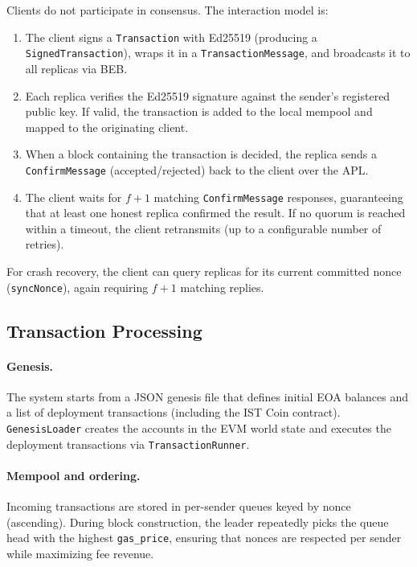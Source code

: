 \documentclass{llncs}
\begin{document}
Clients do not participate in consensus. The interaction model is:

\begin{enumerate}
    \item The client signs a \texttt{Transaction} with Ed25519 (producing a \texttt{SignedTransaction}), wraps it in a \texttt{TransactionMessage}, and broadcasts it to all replicas via BEB.
    \item Each replica verifies the Ed25519 signature against the sender's registered public key. If valid, the transaction is added to the local mempool and mapped to the originating client.
    \item When a block containing the transaction is decided, the replica sends a \texttt{ConfirmMessage} (accepted/rejected) back to the client over the APL.
    \item The client waits for $f{+}1$ matching \texttt{ConfirmMessage} responses, guaranteeing that at least one honest replica confirmed the result. If no quorum is reached within a timeout, the client retransmits (up to a configurable number of retries).
\end{enumerate}

For crash recovery, the client can query replicas for its current committed nonce (\texttt{syncNonce}), again requiring $f{+}1$ matching replies.

\subsection{Transaction Processing}

\paragraph{Genesis.} The system starts from a JSON genesis file that defines initial EOA balances and a list of deployment transactions (including the IST Coin contract). \texttt{GenesisLoader} creates the accounts in the EVM world state and executes the deployment transactions via \texttt{TransactionRunner}.

\paragraph{Mempool and ordering.} Incoming transactions are stored in per-sender queues keyed by nonce (ascending). During block construction, the leader repeatedly picks the queue head with the highest \texttt{gas\_price}, ensuring that nonces are respected per sender while maximizing fee revenue.
\end{document}
